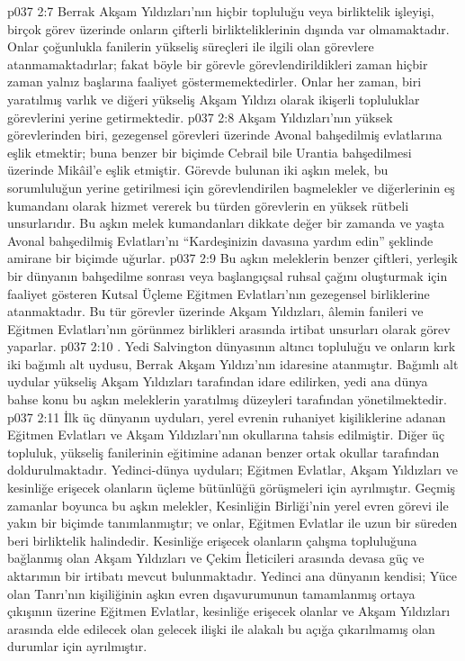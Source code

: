 \vs p037 2:7 Berrak Akşam Yıldızları’nın hiçbir topluluğu veya birliktelik işleyişi, birçok görev üzerinde onların çifterli birlikteliklerinin dışında var olmamaktadır. Onlar çoğunlukla fanilerin yükseliş süreçleri ile ilgili olan görevlere atanmamaktadırlar; fakat böyle bir görevle görevlendirildikleri zaman hiçbir zaman yalnız başlarına faaliyet göstermemektedirler. Onlar her zaman, biri yaratılmış varlık ve diğeri yükseliş Akşam Yıldızı olarak ikişerli topluluklar görevlerini yerine getirmektedir.
\vs p037 2:8 Akşam Yıldızları’nın yüksek görevlerinden biri, gezegensel görevleri üzerinde Avonal bahşedilmiş evlatlarına eşlik etmektir; buna benzer bir biçimde Cebrail bile Urantia bahşedilmesi üzerinde Mikâil’e eşlik etmiştir. Görevde bulunan iki aşkın melek, bu sorumluluğun yerine getirilmesi için görevlendirilen başmelekler ve diğerlerinin eş kumandanı olarak hizmet vererek bu türden görevlerin en yüksek rütbeli unsurlarıdır. Bu aşkın melek kumandanları dikkate değer bir zamanda ve yaşta Avonal bahşedilmiş Evlatları’nı “Kardeşinizin davasına yardım edin” şeklinde amirane bir biçimde uğurlar.
\vs p037 2:9 Bu aşkın meleklerin benzer çiftleri, yerleşik bir dünyanın bahşedilme sonrası veya başlangıçsal ruhsal çağını oluşturmak için faaliyet gösteren Kutsal Üçleme Eğitmen Evlatları’nın gezegensel birliklerine atanmaktadır. Bu tür görevler üzerinde Akşam Yıldızları, âlemin fanileri ve Eğitmen Evlatları’nın görünmez birlikleri arasında irtibat unsurları olarak görev yaparlar.
\vs p037 2:10 . Yedi Salvington dünyasının altıncı topluluğu ve onların kırk iki bağımlı alt uydusu, Berrak Akşam Yıldızı’nın idaresine atanmıştır. Bağımlı alt uydular yükseliş Akşam Yıldızları tarafından idare edilirken, yedi ana dünya bahse konu bu aşkın meleklerin yaratılmış düzeyleri tarafından yönetilmektedir.
\vs p037 2:11 İlk üç dünyanın uyduları, yerel evrenin ruhaniyet kişiliklerine adanan Eğitmen Evlatları ve Akşam Yıldızları’nın okullarına tahsis edilmiştir. Diğer üç topluluk, yükseliş fanilerinin eğitimine adanan benzer ortak okullar tarafından doldurulmaktadır. Yedinci\hyp{}dünya uyduları; Eğitmen Evlatlar, Akşam Yıldızları ve kesinliğe erişecek olanların üçleme bütünlüğü görüşmeleri için ayrılmıştır. Geçmiş zamanlar boyunca bu aşkın melekler, Kesinliğin Birliği’nin yerel evren görevi ile yakın bir biçimde tanımlanmıştır; ve onlar, Eğitmen Evlatlar ile uzun bir süreden beri birliktelik halindedir. Kesinliğe erişecek olanların çalışma topluluğuna bağlanmış olan Akşam Yıldızları ve Çekim İleticileri arasında devasa güç ve aktarımın bir irtibatı mevcut bulunmaktadır. Yedinci ana dünyanın kendisi; Yüce olan Tanrı’nın kişiliğinin aşkın evren dışavurumunun tamamlanmış ortaya çıkışının üzerine Eğitmen Evlatlar, kesinliğe erişecek olanlar ve Akşam Yıldızları arasında elde edilecek olan gelecek ilişki ile alakalı bu açığa çıkarılmamış olan durumlar için ayrılmıştır.
